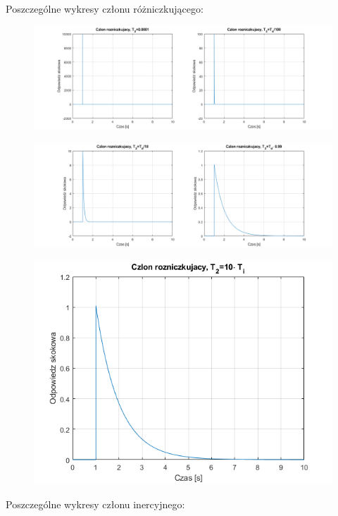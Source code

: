 \documentclass{article}
\begin{document}
\newpage
Poszczególne wykresy członu różniczkującego:

\begin{figure}[h!]
    \centering
    \includegraphics[scale=0.5]{roz_1_2.png}

    \label{fig:my_label}
\end{figure}{}

\begin{figure}[h!]
    \centering
    \includegraphics[scale=0.5]{roz_3_4.png}

    \label{fig:my_label}
\end{figure}{}

\begin{figure}[h!]
    \centering
    \includegraphics[scale=0.5]{roz_6.png}
    \label{fig:my_label}
\end{figure}{}
\newpage
Poszczególne wykresy członu inercyjnego:
\end{document}
